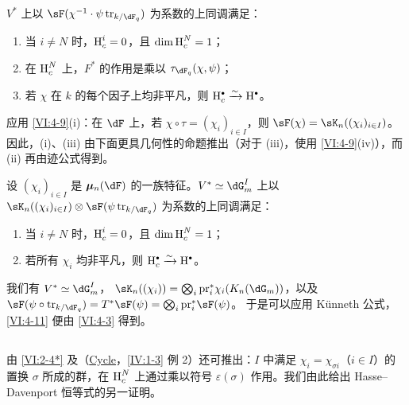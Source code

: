 \begin{proposition_}\label{VI:4-10}
$V^\ast$ 上以 $\sF(\chi^{-1}\cdot\psi\tr_{k/\dF_q})$ 为系数的上同调满足：
\begin{enumerate}[\indent (i)]
\item 当 $i\ne N$ 时，$\operatorname{H}_c^i=0$，且 $\dim\operatorname{H}_c^N=1$；
\item 在 $\operatorname{H}_c^N$ 上，$F^\ast$ 的作用是乘以 $\tau_{\dF_q}(\chi,\psi)$；
\item 若 $\chi$ 在 $k$ 的每个因子上均非平凡，则 $\h_c^\bullet\iso\h^\bullet$。
\end{enumerate}
\end{proposition_}
应用 \ref{VI:4-9}(i)：在 $\dF$ 上，若 $\chi\circ\tau=(\chi_i)_{i\in I}$，则 $\sF(\chi)=\sK_n((\chi_i)_{i\in I})$。因此，(i)、(iii) 由下面更具几何性的命题推出（对于 (iii)，使用 \ref{VI:4-9}(iv)），而 (ii) 再由迹公式得到。

\begin{proposition_}\label{VI:4-11}
设 $(\chi_i)_{i\in I}$ 是 $\dmu_n(\dF)$ 的一族特征。$V^\ast\simeq\dG_m^I$ 上以
$\sK_n((\chi_i)_{i\in I})\otimes\sF(\psi\tr_{k/\dF_q})$
为系数的上同调满足：
\begin{enumerate}[\indent (i)]
\item 当 $i\ne N$ 时，$\operatorname{H}_c^i=0$，且 $\dim\operatorname{H}_c^N=1$；
\item 若所有 $\chi_i$ 均非平凡，则 $\h_c^\bullet\iso\h^\bullet$。
\end{enumerate}
\end{proposition_}
我们有 $V^\ast\simeq\dG_m^I$，
$\sK_n((\chi_i))=\bigotimes_i\pr_i^\ast\chi_i(K_n(\dG_m))$，以及
$\sF(\psi\circ\tr_{k/\dF_q})=T^\ast\sF(\psi)=\bigotimes_i\pr_i^\ast\sF(\psi)$。
于是可以应用 Künneth 公式，\ref{VI:4-11} 便由 \ref{VI:4-3} 得到。

\subsection{}\label{VI:4-12}
由 \ref{VI:2-4*} 及（\hyperref[IV]{Cycle}，\ref{IV:1-3} 例 2）还可推出：$I$ 中满足 $\chi_i=\chi_{\sigma i}$（$i\in I$）的置换 $\sigma$ 所成的群，在 $\operatorname{H}_c^N$ 上通过乘以符号 $\varepsilon(\sigma)$ 作用。我们由此给出 Hasse--Davenport 恒等式的另一证明。

